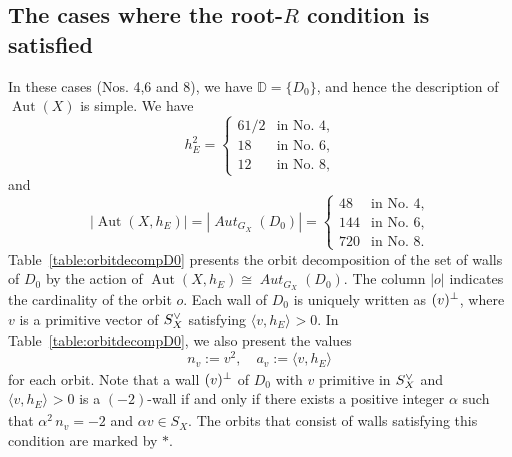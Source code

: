 \documentclass{amsart}
\theoremstyle{plain}
\theoremstyle{definition}
\theoremstyle{remark}
\numberwithin{equation}{section}
\numberwithin{table}{section}
\numberwithin{figure}{section}
\newcommand{\D}{\mathord{\mathbb D}}
\newcommand{\sperp}{\sp{\perp}}
\newcommand{\dual}{\sp{\vee}}
\newcommand{\Aut}{\operatorname{\mathrm {Aut}}\nolimits}
\newcommand{\intM}[2]{\langle{#1}\rangle_{#2}}
\newcommand{\aut}{\operatorname{\mathit {Aut}}\nolimits}
\newcommand{\Chams}{\D}
\begin{document}
\subsection{The cases where the root-$R$ condition is satisfied}\label{subsec:easyexamples}
%
In these cases (Nos. 4,6 and 8), we have $\Chams=\{D_0\}$,
and hence the description of $\Aut(X)$ is simple.
We  have
$$
h_E^2=
\begin{cases}
61/2 & \textrm{in No. 4,}\\
18 & \textrm{in No. 6,}\\
12 & \textrm{in No. 8,}
\end{cases}
$$
and
$$
|\Aut(X, h_E)|=|\aut_{G_X}(D_0)|=
\begin{cases}
48 & \textrm{in No. 4,}\\
144 & \textrm{in No. 6,}\\
720 & \textrm{in No. 8.}
\end{cases}
$$
Table~\ref{table:orbitdecompD0} presents the orbit decomposition of the set of walls
of $D_0$ by the action of $\Aut(X, h_E)\cong \aut_{G_X}(D_0)$.
The column $|o|$ indicates the cardinality of the orbit $o$.
Each wall of $D_0$ is uniquely written as $(v)\sperp$,
where $v$ is a primitive vector of $S_X\dual$ satisfying $\intM{v, h_E}{}>0$.
In Table~\ref{table:orbitdecompD0},
we also present the values
$$
n_v:=v^2, \quad a_v:=\intM{v, h_E}{}
$$
for each orbit.
Note that a wall $(v)\sperp$ of $D_0$ with $v$ primitive in $S_X\dual$ and $\intM{v, h_E}{}>0$
is a $(-2)$-wall if and only if there exists a positive integer $\alpha$
such that $\alpha^2\, n_v=-2$ and $\alpha v\in S_X$.
The orbits that consist of walls satisfying this condition are marked by $*$. %
%
\end{document}
